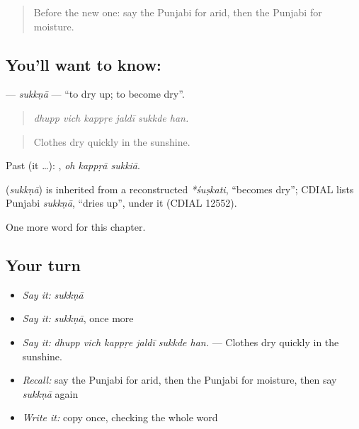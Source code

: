 \label{lesson:PA-C292-sukkna}



\begin{quote}
Before the new one: say the Punjabi for arid, then the Punjabi for moisture.
\end{quote}

\subsection*{You'll want to know: }
\textbf{} — \emph{sukkṇā} — \textquotedblleft{}to dry up; to become dry\textquotedblright{}.

\begin{quote}
     
\end{quote}

\begin{quote}
\emph{dhupp vich kappṛe jaldī sukkde han.}
\end{quote}

\begin{quote}
Clothes dry quickly in the sunshine.
\end{quote}

Past (it …):   , \emph{oh kappṛā sukkiā}.

\begin{cousinweb}
\textbf{} (\emph{sukkṇā}) is inherited from a reconstructed \emph{*śuṣkati}, \textquotedblleft{}becomes dry\textquotedblright{}; CDIAL lists Punjabi \emph{sukkṇā}, \textquotedblleft{}dries up\textquotedblright{}, under it (CDIAL 12552).
\end{cousinweb}

\begin{grammarlens}[title={What you've built}]
One more word for this chapter.
\end{grammarlens}

\subsection*{Your turn}
\begin{itemize}
\raggedright
  \item \emph{Say it:} \emph{sukkṇā}
  \item \emph{Say it:} \emph{sukkṇā}, once more
  \item \emph{Say it:} \emph{dhupp vich kappṛe jaldī sukkde han.} — Clothes dry quickly in the sunshine.
  \item \emph{Recall:} say the Punjabi for arid, then the Punjabi for moisture, then say \emph{sukkṇā} again
  \item \emph{Write it:} copy \textbf{} once, checking the whole word
\end{itemize}

